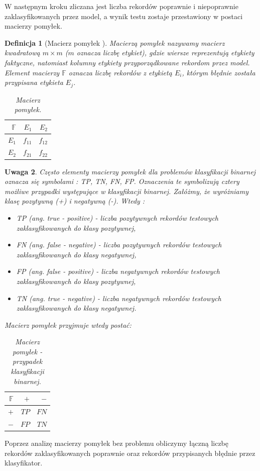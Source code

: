 \documentclass[12pt,a4paper]{report}
\newtheorem{df}{Definicja}[chapter]
\newtheorem{uwaga}[df]{Uwaga}
\begin{document}
W następnym kroku zliczana jest liczba rekordów poprawnie i niepoprawnie zaklasyfikowanych przez model, a wynik testu zostaje przestawiony w postaci macierzy pomyłek.
\begin{df}[Macierz pomyłek {\citep[Sec 4.8.1]{edmia}}]
Macierzą pomyłek nazywamy macierz kwadratową $ m \times m$ ($m$ oznacza liczbę etykiet), gdzie wiersze reprezentują etykiety faktyczne, natomiast kolumny etykiety przyporządkowane rekordom przez model. Element macierzy $\mathbb{F}$ oznacza liczbę rekordów z etykietą $E_i$, którym błędnie została przypisana etykieta $E_j$.
\begin{table}[H]
\begin{center}
\begin{tabular}{|r|r|r|} \hline
$\mathbb{F}$ & $E_1$ & $E_2$\\
\hline 
$E_1$ & $f_{11}$ & $f_{12}$ \\
\hline
$E_2$ & $f_{21}$ & $f_{22}$  \\
\hline
\end{tabular}
\end{center}
\caption{Macierz pomyłek.}
\label{tabelka}
\end{table}
\end{df}
\begin{uwaga}{\citep[Sec 4.8.1]{edmia}}
Często elementy macierzy pomyłek dla problemów klasyfikacji binarnej oznacza się symbolami : TP, TN, FN, FP. Oznaczenia te symbolizują cztery możliwe przypadki występujące w klasyfikacji binarnej. Załóżmy, że wyróżniamy klasę pozytywną (+) i negatywną (-). Wtedy :
\begin{itemize}
\item TP (ang. true - positive) - liczba pozytywnych rekordów testowych zaklasyfikowanych do klasy pozytywnej,
\item FN (ang. false - negative) - liczba pozytywnych rekordów testowych zaklasyfikowanych do klasy negatywnej,
\item FP (ang. false - positive) - liczba negatywnych rekordów testowych zaklasyfikowanych do klasy pozytywnej,
\item TN (ang. true - negative) - liczba negatywnych rekordów testowych zaklasyfikowanych do klasy negatywnej.
\end{itemize}
Macierz pomyłek przyjmuje wtedy postać:
\begin{table}[H]
\begin{center}
\begin{tabular}{|r|r|r|} \hline
$\mathbb{F}$ & $+$ & $-$\\
\hline
$+$ & $TP$ & $FN$ \\
\hline
$-$ & $FP$ & $TN$  \\
\hline
\end{tabular}
\end{center}
\caption{Macierz pomyłek - przypadek klasyfikacji binarnej.}
\label{tabelka}
\end{table}
\end{uwaga}
Poprzez analizę macierzy pomyłek bez problemu obliczymy łączną liczbę rekordów zaklasyfikowanych poprawnie oraz rekordów przypisanych błędnie przez klasyfikator. 
\end{document}
